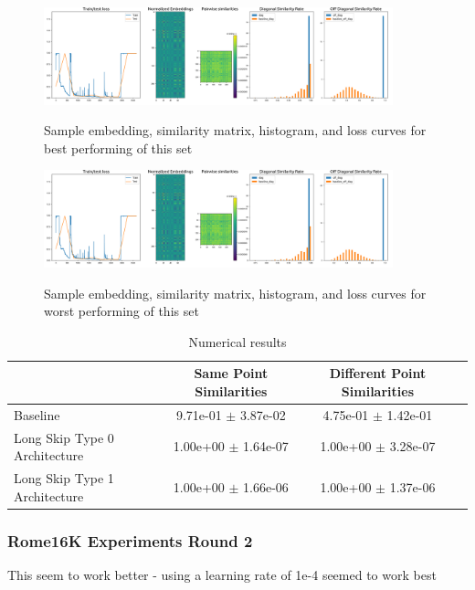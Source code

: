 \documentclass[a4paper]{article}
\begin{document}
\begin{figure}[H]
  \includegraphics[width=0.9\textwidth]{figures/rome16kknn0-longskip0-load-true-0}
  \label{fig:rome16kknn0-longskip0-load-true-0-sub1}
  \caption{Sample embedding, similarity matrix, histogram, and loss curves for best performing of this set}
\end{figure}
\begin{figure}[H]
  \includegraphics[width=0.9\textwidth]{figures/rome16kknn0-longskip0-load-true-0}
  \label{fig:rome16kknn0-longskip0-load-true-0-sub1}
  \caption{Sample embedding, similarity matrix, histogram, and loss curves for worst performing of this set}
\end{figure}
\begin{table}[H]
  \caption{Numerical results}
      \begin{tabular}{|l|c|c|c|} \hline
                                      &  Same Point Similarities  &  Different Point Similarities  \\ \hline
Baseline   & 9.71e-01 $\pm$ 3.87e-02 & 4.75e-01 $\pm$ 1.42e-01 \\ \hline
Long Skip Type 0 Architecture   & 1.00e+00 $\pm$ 1.64e-07 & 1.00e+00 $\pm$ 3.28e-07 \\ \hline
Long Skip Type 1 Architecture   & 1.00e+00 $\pm$ 1.66e-06 & 1.00e+00 $\pm$ 1.37e-06 \\ \hline
      \end{tabular}
      \label{fig:tab1}
\end{table}

\subsubsection*{Rome16K Experiments Round 2}
This seem to work better - using a learning rate of 1e-4 seemed to work best
\end{document}
